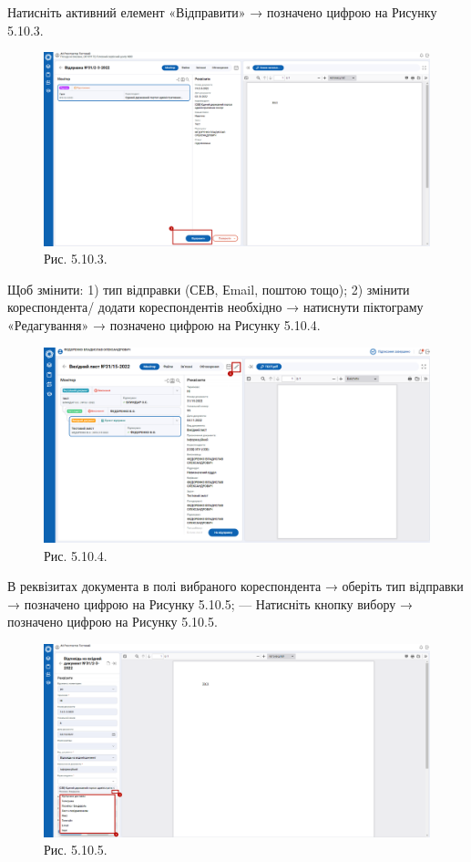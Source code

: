 Натисніть активний елемент «Відправити» → позначено цифрою  на Рисунку 5.10.3.

\begin{figure}[!htbp]
\centerline{\includegraphics[width=\textwidth]{img/5.10.3.png}}
\caption{Рис. 5.10.3. }
\end{figure}

Щоб змінити:
1) тип відправки (СЕВ, Еmail, поштою тощо);
2) змінити кореспондента/ додати кореспондентів необхідно
→ натиснути піктограму «Редагування» → позначено цифрою  на Рисунку 5.10.4.

\begin{figure}[!htbp]
\centerline{\includegraphics[width=\textwidth]{img/5.10.4.png}}
\caption{Рис. 5.10.4. }
\end{figure}

В реквізитах документа в полі вибраного кореспондента → оберіть тип
відправки → позначено цифрою  на Рисунку 5.10.5;
--- Натисніть кнопку вибору → позначено цифрою  на Рисунку 5.10.5.

\begin{figure}[!htbp]
\centerline{\includegraphics[width=\textwidth]{img/5.10.5.png}}
\caption{Рис. 5.10.5. }
\end{figure}

